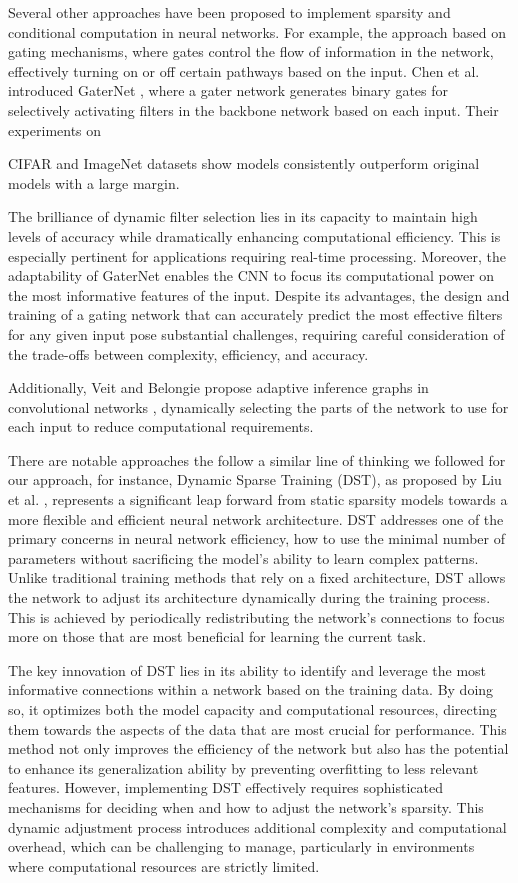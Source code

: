 Several other approaches have been proposed to implement sparsity and conditional computation in neural networks. For example, the approach based on gating mechanisms, where gates control the flow of information in the network, effectively turning on or off certain pathways based on the input. Chen et al. introduced GaterNet  \cite{chen2019you}, where a gater network generates binary gates for selectively activating filters in the backbone network based on each input. Their experiments on  CIFAR and ImageNet datasets show models consistently outperform original models with a large margin.

The brilliance of dynamic filter selection lies in its capacity to maintain high levels of accuracy while dramatically enhancing computational efficiency. This is especially pertinent for applications requiring real-time processing. Moreover, the adaptability of GaterNet enables the CNN to focus its computational power on the most informative features of the input. Despite its advantages, the design and training of a gating network that can accurately predict the most effective filters for any given input pose substantial challenges, requiring careful consideration of the trade-offs between complexity, efficiency, and accuracy.

Additionally, Veit and Belongie propose adaptive inference graphs in convolutional networks \cite{veit2020convolutional}, dynamically selecting the parts of the network to use for each input to reduce computational requirements.

There are notable approaches the follow a similar line of thinking we followed for our approach, for instance, Dynamic Sparse Training (DST), as proposed by Liu et al. \cite{liu2020dynamic}, represents a significant leap forward from static sparsity models towards a more flexible and efficient neural network architecture. DST addresses one of the primary concerns in neural network efficiency, how to use the minimal number of parameters without sacrificing the model's ability to learn complex patterns. Unlike traditional training methods that rely on a fixed architecture, DST allows the network to adjust its architecture dynamically during the training process. This is achieved by periodically redistributing the network's connections to focus more on those that are most beneficial for learning the current task. 

The key innovation of DST lies in its ability to identify and leverage the most informative connections within a network based on the training data. By doing so, it optimizes both the model capacity and computational resources, directing them towards the aspects of the data that are most crucial for performance. This method not only improves the efficiency of the network but also has the potential to enhance its generalization ability by preventing overfitting to less relevant features. However, implementing DST effectively requires sophisticated mechanisms for deciding when and how to adjust the network's sparsity. This dynamic adjustment process introduces additional complexity and computational overhead, which can be challenging to manage, particularly in environments where computational resources are strictly limited.

